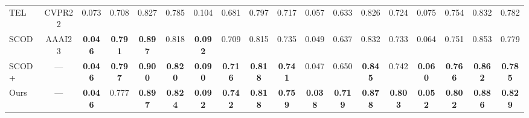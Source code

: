 \begin{table}[t]
{\begin{tabular}{l|c|cccc|cccc|cccc|cccc}
TEL~\cite{liang2022tree}                                           & CVPR22                                             & 0.073                                 & 0.708                                 & 0.827                                 & 0.785                                 & 0.104                                 & 0.681                                 & 0.797                                 & 0.717                                 & 0.057                                 & 0.633                                 & 0.826                                 & 0.724                                 & 0.075                                 & 0.754                                 & 0.832                                 & 0.782                                 \\
SCOD~\cite{he2022weakly}                                         & AAAI23                                             & {\color[HTML]{FF0000} \textbf{0.046}} & {\color[HTML]{00B0F0} \textbf{0.791}} & {\color[HTML]{00B0F0} \textbf{0.897}} & 0.818                                 & {\color[HTML]{00B0F0} \textbf{0.092}} & 0.709                                 & 0.815                                 & 0.735                                 & 0.049                                 & 0.637                                 & 0.832                                 & 0.733                                 & 0.064                                 & 0.751                                 & 0.853                                 & 0.779                                 \\
\rowcolor{c2!20} SCOD+ & \multicolumn{1}{c|}{---} & {\color[HTML]{FF0000} \textbf{0.046}} & {\color[HTML]{FF0000} \textbf{0.797}} & {\color[HTML]{FF0000} \textbf{0.900}} & {\color[HTML]{00B0F0} \textbf{0.820}} & {\color[HTML]{FF0000} \textbf{0.090}} &{\color[HTML]{00B0F0} \textbf{0.716}} & {\color[HTML]{FF0000} \textbf{0.818}} &{\color[HTML]{00B0F0} \textbf{0.741}} &0.047 & 0.650 &{\color[HTML]{00B0F0} \textbf{0.845}} &0.742 & {\color[HTML]{00B0F0} \textbf{0.060}} &{\color[HTML]{00B0F0} \textbf{0.766}} &{\color[HTML]{00B0F0} \textbf{0.862}} &{\color[HTML]{00B0F0} \textbf{0.785}}\\
\rowcolor{c2!20}Ours & \multicolumn{1}{c|}{---} & {\color[HTML]{FF0000} \textbf{0.046}} & 0.777    & {\color[HTML]{00B0F0} \textbf{0.897}} & {\color[HTML]{FF0000} \textbf{0.824}} & {\color[HTML]{00B0F0} \textbf{0.092}} & {\color[HTML]{FF0000} \textbf{0.742}} & {\color[HTML]{FF0000} \textbf{0.818}} & {\color[HTML]{FF0000} \textbf{0.759}} & {\color[HTML]{FF0000} \textbf{0.038}} & {\color[HTML]{FF0000} \textbf{0.719}} & {\color[HTML]{FF0000} \textbf{0.878}} & {\color[HTML]{FF0000} \textbf{0.803}} & {\color[HTML]{FF0000} \textbf{0.052}} & {\color[HTML]{FF0000} \textbf{0.802}} & {\color[HTML]{FF0000} \textbf{0.886}} & {\color[HTML]{FF0000} \textbf{0.829}} \\ \midrule

\end{tabular}}
\end{table}
